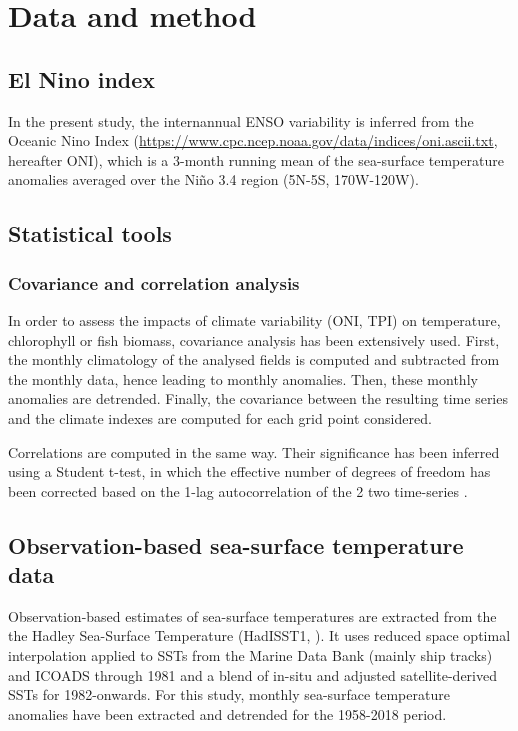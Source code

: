 \section{Data and method}

\subsection{El Nino index}
\label{sec:oni}

In the present study, the internannual ENSO variability is inferred from the Oceanic Nino Index (\url{https://www.cpc.ncep.noaa.gov/data/indices/oni.ascii.txt}, hereafter ONI), which is a 3-month running mean of the sea-surface temperature anomalies averaged over the Niño 3.4 region (5N-5S, 170W-120W).\\

\subsection{Statistical tools}

\subsubsection{Covariance and correlation analysis}
\label{sec:cov}

In order to assess the impacts of climate variability (ONI, TPI) on temperature, chlorophyll or fish biomass, covariance analysis has been extensively used. First, the monthly climatology of the analysed fields is computed and subtracted from the monthly data, hence leading to monthly anomalies. Then, these monthly anomalies are detrended. Finally, the covariance between the resulting time series and the climate indexes are computed for each grid point considered. 

Correlations are computed in the same way. Their significance has been inferred using a Student t-test, in which the effective number of degrees of freedom has been corrected based on the 1-lag autocorrelation of the 2 two time-series \citep{brethertonEffectiveNumberSpatial1999}.

\subsection{Observation-based sea-surface temperature data}

Observation-based estimates of sea-surface temperatures are extracted from the the Hadley Sea-Surface Temperature (HadISST1, \citealt{raynerGlobalAnalysesSea2003}). It uses reduced space optimal interpolation applied to SSTs from the Marine Data Bank (mainly ship tracks) and ICOADS through 1981 and a blend of in-situ and adjusted satellite-derived SSTs for 1982-onwards. For this study, monthly sea-surface temperature anomalies have been extracted and detrended for the 1958-2018 period.


